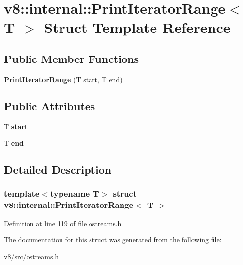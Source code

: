 \hypertarget{structv8_1_1internal_1_1PrintIteratorRange}{}\section{v8\+:\+:internal\+:\+:Print\+Iterator\+Range$<$ T $>$ Struct Template Reference}
\label{structv8_1_1internal_1_1PrintIteratorRange}
\subsection*{Public Member Functions}
\begin{DoxyCompactItemize}
\item 
\mbox{\label{structv8_1_1internal_1_1PrintIteratorRange_aa0c71f0407e85e3203d95ae772b0eb1e}} 
{\bfseries Print\+Iterator\+Range} (T start, T end)
\end{DoxyCompactItemize}
\subsection*{Public Attributes}
\begin{DoxyCompactItemize}
\item 
\mbox{\label{structv8_1_1internal_1_1PrintIteratorRange_a9852e9a1bc20390244da401ffa4ce2c1}} 
T {\bfseries start}
\item 
\mbox{\label{structv8_1_1internal_1_1PrintIteratorRange_a55b10c2c5fc295c0ca95744f20b0a3a0}} 
T {\bfseries end}
\end{DoxyCompactItemize}


\subsection{Detailed Description}
\subsubsection*{template$<$typename T$>$\newline
struct v8\+::internal\+::\+Print\+Iterator\+Range$<$ T $>$}



Definition at line 119 of file ostreams.\+h.



The documentation for this struct was generated from the following file\+:\begin{DoxyCompactItemize}
\item 
v8/src/ostreams.\+h\end{DoxyCompactItemize}
